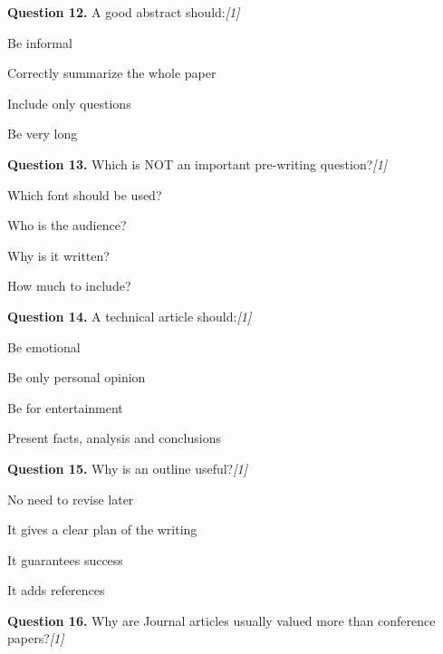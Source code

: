 \documentclass[11pt,a4paper]{article}
\newcommand{\pts}[1]{\hfill   \textit{[#1]}}
\begin{document}
\noindent   \textbf{Question 12.} A good abstract should:\pts{1}

\begin{parts}
  \item Be informal
  \item Correctly summarize the whole paper
  \item Include only questions
  \item Be very long
\end{parts}

\medskip




\noindent   \textbf{Question 13.} Which is NOT an important pre-writing question?\pts{1}

\begin{parts}
  \item Which font should be used?
  \item Who is the audience?
  \item Why is it written?
  \item How much to include?
\end{parts}

\medskip




\noindent   \textbf{Question 14.} A technical article should:\pts{1}

\begin{parts}
  \item Be emotional
  \item Be only personal opinion
  \item Be for entertainment
  \item Present facts, analysis and conclusions
\end{parts}

\medskip




\noindent   \textbf{Question 15.} Why is an outline useful?\pts{1}

\begin{parts}
  \item No need to revise later
  \item It gives a clear plan of the writing
  \item It guarantees success
  \item It adds references
\end{parts}

\medskip




\noindent   \textbf{Question 16.} Why are Journal articles usually valued more than conference papers?\pts{1}
\end{document}
